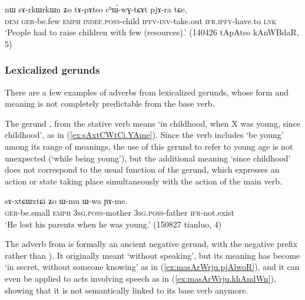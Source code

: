 \begin{exe}
\ex \label{ex:sArkWrkWn.chWwGtCAt}
\gll nɯ sɤ-rkɯ\redp{}rkɯn ʑo tɤ-pɤtso cʰɯ́-wɣ-tɕɤt pjɤ-ra tɕe, \\
\textsc{dem} \textsc{ger}-be.few \textsc{emph} \textsc{indef}.\textsc{poss}-child \textsc{ipfv}-\textsc{inv}-take.out \textsc{ifr}.\textsc{ipfv}-have.to \textsc{lnk} \\ 
\glt `People had to raise children with few (resources).' (140426 tApAtso kAnWBdaR, 5)
\end{exe}


\subsubsection{Lexicalized gerunds}  \label{sec:gerund.lexicalized}
There are a few examples of adverbs from lexicalized gerunds, whose form and meaning is not completely predictable from the base verb.

The gerund , from the stative verb  means `in childhood, when X was young, since childhood', as in (\ref{ex:sAxtCWtCi.YAme}). Since the verb  includes `be young' among its range of meanings, the use of this gerund to refer to young age is not unexpected (`while being young'), but the additional meaning `since  childhood' does not correspond to the usual function of the gerund, which expresses an action or state taking place simultaneously with the action of the main verb.

\begin{exe}
\ex \label{ex:sAxtCWtCi.YAme}
\gll sɤ-xtɕɯ\redp{}xtɕi ʑo ɯ-mu ɯ-wa ɲɤ-me. \\
\textsc{ger}-be.small \textsc{emph} \textsc{3sg}.\textsc{poss}-mother  \textsc{3sg}.\textsc{poss}-father \textsc{ifr}-not.exist \\ 
\glt `He lost his parents when he was young.' (150827 tianluo, 4)
\end{exe}

The adverb   from  is formally an ancient negative gerund, with the negative prefix  rather than ). It originally meant `without speaking', but its meaning has become `in secret, without someone knowing' as in (\ref{ex:masArWrju.pjAlwoR}), and it can even be applied to acts involving speech as in (\ref{ex:masArWrju.khAndWn}), showing that it is not semantically linked to its base verb anymore.

